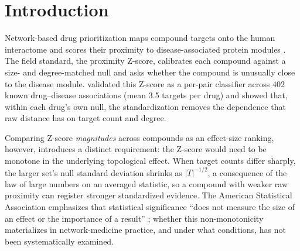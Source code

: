 \section{Introduction}

Network-based drug prioritization maps compound targets onto the human interactome and scores their proximity to disease-associated protein modules \citep{Hopkins2008, Barabasi2011, Menche2015, Guney2016}. The field standard, the proximity Z-score, calibrates each compound against a size- and degree-matched null and asks whether the compound is unusually close to the disease module. \citet{Guney2016} validated this Z-score as a per-pair classifier across 402 known drug--disease associations (mean 3.5 targets per drug) and showed that, within each drug's own null, the standardization removes the dependence that raw distance has on target count and degree.

Comparing Z-score \textit{magnitudes} across compounds as an effect-size ranking, however, introduces a distinct requirement: the Z-score would need to be monotone in the underlying topological effect. When target counts differ sharply, the larger set's null standard deviation shrinks as $|T|^{-1/2}$, a consequence of the law of large numbers on an averaged statistic, so a compound with weaker raw proximity can register stronger standardized evidence. The American Statistical Association emphasizes that statistical significance ``does not measure the size of an effect or the importance of a result'' \citep{Wasserstein2016}; whether this non-monotonicity materializes in network-medicine practice, and under what conditions, has not been systematically examined.

